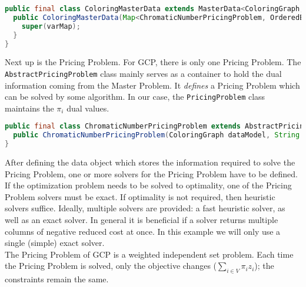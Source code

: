 \documentclass[a4paper]{article}
\newenvironment{myblock}[1]{%
    \tcolorbox[beamer,%
    noparskip,breakable,
    colback=lightBlueCodeBlock,colframe=darkBlueCodeBlock,%
    colbacklower=darkBlueCodeBlock!75!lightBlueCodeBlock,%
    coltitle=blueTitleCodeBlock,
    title=#1]}%
    {\endtcolorbox}
\newcommand{\code}[1]{\lstinline[language=java, style=seminar]!#1!}
\begin{document}
\begin{myblock}{ColoringMasterData}
\begin{lstlisting}[language=java, style=eclipseArticle, xleftmargin=2em]  
public final class ColoringMasterData extends MasterData<ColoringGraph, IndependentSet, ChromaticNumberPricingProblem, IloNumVar>{
  public ColoringMasterData(Map<ChromaticNumberPricingProblem, OrderedBiMap<IndependentSet, IloNumVar>> varMap) {
    super(varMap);
  }
}
\end{lstlisting}
\end{myblock}

Next up is the Pricing Problem. For GCP, there is only one Pricing Problem.  The \code{AbstractPricingProblem} class mainly serves as a container to hold the dual information coming from the Master Problem. It \emph{defines} a Pricing Problem which can be solved by some algorithm. In our case, the \code{PricingProblem} class maintains the $\pi_i$ dual values.
\begin{myblock}{ChromaticNumberPricingProblem}
\begin{lstlisting}[language=java, style=eclipseArticle, xleftmargin=2em]  
public final class ChromaticNumberPricingProblem extends AbstractPricingProblem<ColoringGraph> {
  public ChromaticNumberPricingProblem(ColoringGraph dataModel, String name) { super(dataModel, name); }
}
\end{lstlisting}
\end{myblock}
After defining the data object which stores the information required to solve the Pricing Problem, one or more solvers for the Pricing Problem have to be defined. If the optimization problem needs to be solved to optimality, one of the Pricing Problem solvers must be exact. If optimality is not required, then heuristic solvers suffice. Ideally, multiple solvers are provided: a fast heuristic solver, as well as an exact solver. In general it is beneficial if a solver returns multiple columns of negative reduced cost at once. In this example we will only use a single (simple) exact solver.\\
The Pricing Problem of GCP is a weighted independent set problem. Each time the Pricing Problem is solved, only the objective changes ($\sum_{i\in V}\pi_i z_i$); the constraints remain the same.
\end{document}

